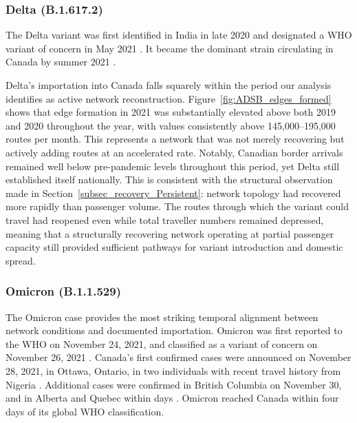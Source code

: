 \documentclass{elsarticle}
\begin{document}
\subsubsection*{Delta (B.1.617.2)}

The Delta variant was first identified in India in late 2020 and designated a WHO variant of concern in May 2021 \cite{WHO_delta_2021}. It became the dominant strain circulating in Canada by summer 2021 \cite{PHAC_variants}.

Delta's importation into Canada falls squarely within the period our analysis identifies as active network reconstruction. Figure~\ref{fig:ADSB_edges_formed} shows that edge formation in 2021 was substantially elevated above both 2019 and 2020 throughout the year, with values consistently above 145,000--195,000 routes per month. This represents a network that was not merely recovering but actively adding routes at an accelerated rate. Notably, Canadian border arrivals remained well below pre-pandemic levels throughout this period, yet Delta still established itself nationally. This is consistent with the structural observation made in Section~\ref{subsec_recovery_Persistent}: network topology had recovered more rapidly than passenger volume. The routes through which the variant could travel had reopened even while total traveller numbers remained depressed, meaning that a structurally recovering network operating at partial passenger capacity still provided sufficient pathways for variant introduction and domestic spread.

\subsubsection*{Omicron (B.1.1.529)}

The Omicron case provides the most striking temporal alignment between network conditions and documented importation. Omicron was first reported to the WHO on November 24, 2021, and classified as a variant of concern on November 26, 2021 \cite{WHO_omicron_2021}. Canada's first confirmed cases were announced on November 28, 2021, in Ottawa, Ontario, in two individuals with recent travel history from Nigeria \cite{ontario_omicron_2021}. Additional cases were confirmed in British Columbia on November 30, and in Alberta and Quebec within days \cite{bc_omicron_2021}. Omicron reached Canada within four days of its global WHO classification.
\end{document}
